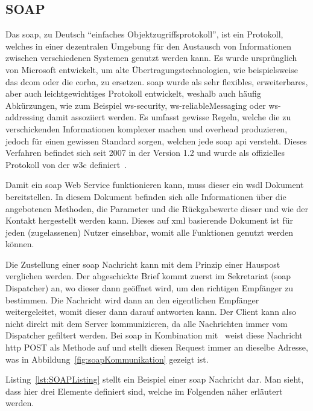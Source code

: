 \subsection{SOAP}\label{subsec:soap}
	Das \gls{soap}, zu Deutsch \enquote{einfaches Objektzugriffsprotokoll}, ist ein Protokoll,
	welches in einer dezentralen Umgebung für den Austausch von Informationen
	zwischen verschiedenen Systemen genutzt werden kann.
	Es wurde ursprünglich von Microsoft entwickelt, um alte Übertragungstechnologien,
	wie beispielsweise das \gls{dcom} oder die \gls{corba}, zu ersetzen.
	\gls{soap} wurde als sehr flexibles, erweiterbares,
	aber auch leichtgewichtiges Protokoll entwickelt,
	weshalb auch häufig Abkürzungen, wie zum Beispiel \gls{ws-security},
	\gls{ws-reliableMessaging} oder \gls{ws-addressing} damit assoziiert werden.
	Es umfasst gewisse Regeln,
	welche die zu verschickenden Informationen komplexer machen und \gls{overhead} produzieren,
	jedoch für einen gewissen Standard sorgen,
	welchen jede \gls{soap} \gls{api} versteht.
	Dieses Verfahren befindet sich seit 2007 in der Version 1.2
	und wurde als offizielles Protokoll von der \gls{w3c} definiert~\cite[Vgl.][]{SOAP_W3C}.

	Damit ein \gls{soap} Web Service funktionieren kann,
	muss dieser ein \gls{wsdl} Dokument bereitstellen.
	In diesem Dokument befinden sich alle Informationen über die angebotenen Methoden,
	die Parameter und die Rückgabewerte dieser und wie der Kontakt hergestellt werden kann.
	Dieses auf \gls{xml} basierende Dokument ist für jeden (zugelassenen) Nutzer einsehbar,
	womit alle Funktionen genutzt werden können.

	Die Zustellung einer \gls{soap} Nachricht kann mit dem Prinzip einer Hauspost verglichen werden.
	Der abgeschickte Brief kommt zuerst im Sekretariat (\gls{soap} Dispatcher) an,
	wo dieser dann geöffnet wird, um den richtigen Empfänger zu bestimmen.
	Die Nachricht wird dann an den eigentlichen Empfänger weitergeleitet,
	womit dieser dann darauf antworten kann.
	Der Client kann also nicht direkt mit dem Server kommunizieren,
	da alle Nachrichten immer vom Dispatcher gefiltert werden.
	Bei \gls{soap} in Kombination mit~ weist diese Nachricht
	\gls{http} POST als Methode auf und
	stellt diesen Request immer an dieselbe Adresse,
	was in Abbildung~\ref{fig:soapKommunikation} gezeigt ist.

	Listing~\ref{lst:SOAPListing} stellt ein Beispiel einer \gls{soap} Nachricht dar.
	Man sieht, dass hier drei Elemente definiert sind,
	welche im Folgenden näher erläutert werden.

